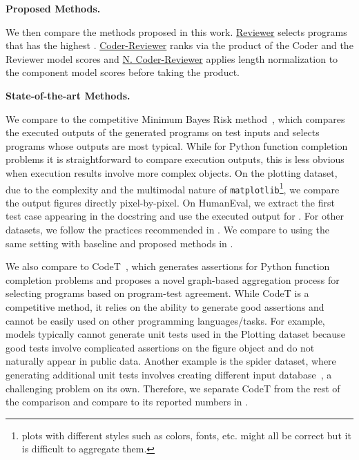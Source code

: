 \documentclass[nohyperref]{article}
\theoremstyle{plain}
\theoremstyle{definition}
\theoremstyle{remark}
\renewcommand{\paragraph}[1]{
     \textbf{#1} 
 }
\begin{document}
\paragraph{Proposed Methods.}
We then compare the methods proposed in this work. \underline{Reviewer} selects programs that has the highest .
\underline{Coder-Reviewer} ranks via the product of the Coder and the Reviewer model scores and \underline{N. Coder-Reviewer} applies length normalization to the component model scores before taking the product.

\paragraph{State-of-the-art Methods.}
We compare to the competitive Minimum Bayes Risk method~\citep[\mbr{};][]{mbr}, which compares the executed outputs of the generated programs on test inputs and selects programs whose outputs are most typical.
While for Python function completion problems it is straightforward to compare execution outputs, this is less obvious when execution results involve more complex objects.
On the plotting dataset, due to the complexity and the multimodal nature of \texttt{matplotlib}\footnote{plots with different styles such as colors, fonts, etc. might all be correct but it is difficult to aggregate them.}, we compare the output figures directly pixel-by-pixel.
On HumanEval, we extract the first test case appearing in the docstring and use the executed output for \mbr{}.
For other datasets, we follow the practices recommended in \citet{mbr}.
We compare to \mbr{} using the same setting with baseline and proposed methods in .

We also compare to CodeT~\citep{codet}, which generates assertions for Python function completion problems and proposes a novel graph-based aggregation process for selecting programs based on program-test agreement.
While CodeT is a competitive method, it relies on the ability to generate good assertions and cannot be easily used on other programming languages/tasks.
For example, models typically cannot generate unit tests used in the Plotting dataset because good tests involve complicated assertions on the figure object and do not naturally appear in public data.
Another example is the spider dataset, where generating additional unit tests involves creating different input database~\citep{active-prior}, a challenging problem on its own.
Therefore, we separate CodeT from the rest of the comparison and compare to its reported numbers in .
\end{document}
